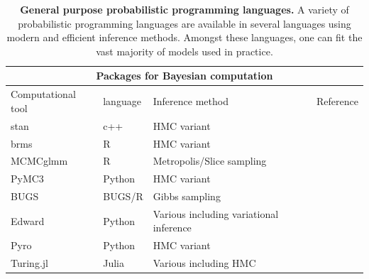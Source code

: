 \documentclass[12pt,english, journal=jpr, layout=twocolumn]{article}
\begin{document}
\begin{table}[ht]
	\centering
	
	\begin{tabular}{ |p{3cm}||p{2cm}|p{7cm}|p{5cm}|  }
		\hline
		\multicolumn{4}{|c|}{Packages for Bayesian computation} \\
		\hline
		Computational tool & language & Inference method & Reference\\
		\hline
		stan   & c++   &HMC variant&   \citep{Carpenter::2017}\\
		brms &   R  & HMC variant   & \citep{Burkner::2017}\\
		MCMCglmm & R & Metropolis/Slice sampling &  \citep{Hadfield::2010}\\
		PyMC3    & Python & HMC variant&  \citep{Salvatier::2016}\\
		BUGS &   BUGS/R  & Gibbs sampling & \citep{Lunn::2009}\\
		Edward&  Python  & Various including variational inference   &\citep{Tran::2016}\\
		Pyro & Python & HMC variant& \citep{Bingham::2019}\\
		Turing.jl & Julia & Various including HMC & \citep{Ge::2018}\\
		\hline
	\end{tabular}
\caption{\textbf{General purpose probabilistic programming languages.} A variety of probabilistic programming languages are available in several languages using modern and efficient inference methods. Amongst these languages, one can fit the vast majority of models used in practice.}
\label{table::bayesian computation}
\end{table}
\end{document}
